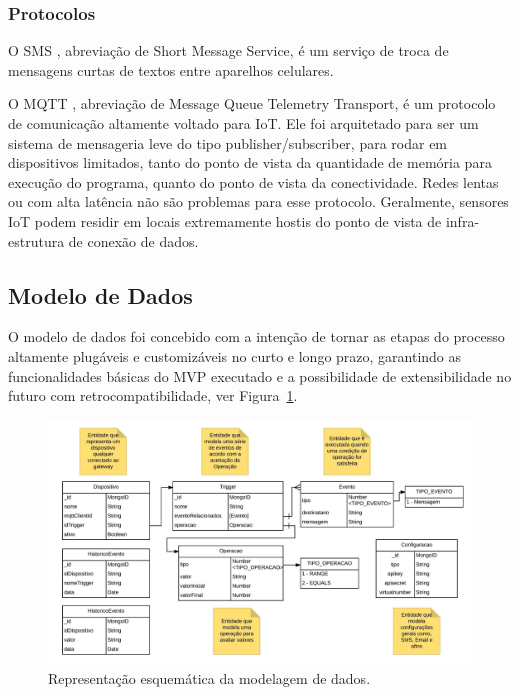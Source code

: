 \subsubsection{Protocolos}
\label{protocolos}

O SMS \cite{SMS}, abreviação de Short Message Service, é um serviço de troca de mensagens curtas de textos entre aparelhos celulares.

O MQTT \cite{Mqtt}, abreviação de Message Queue Telemetry Transport, é um protocolo de comunicação altamente voltado para IoT. Ele foi arquitetado para ser um sistema de mensageria leve do tipo publisher/subscriber, para rodar em dispositivos limitados, tanto do ponto de vista da quantidade de memória para execução do programa, quanto do ponto de vista da conectividade. Redes lentas ou com alta latência não são problemas para esse protocolo. Geralmente, sensores IoT podem residir em locais extremamente hostis do ponto de vista de infra-estrutura de conexão de dados.



\subsection{Modelo de Dados}
O modelo de dados foi concebido com a intenção de tornar as etapas do processo altamente plugáveis e customizáveis no curto e longo prazo, garantindo as funcionalidades básicas do MVP executado e a possibilidade de extensibilidade no futuro com retrocompatibilidade, ver Figura~\ref{fig:modeloDeDados}.

\begin{figure}[h!]
	\begin{center}
		\includegraphics[width=1.085\textwidth]{./img/modelo-de-dados}
		\caption{Representação esquemática da modelagem de dados.}
		\label{fig:modeloDeDados}
	\end{center}
\end{figure}

